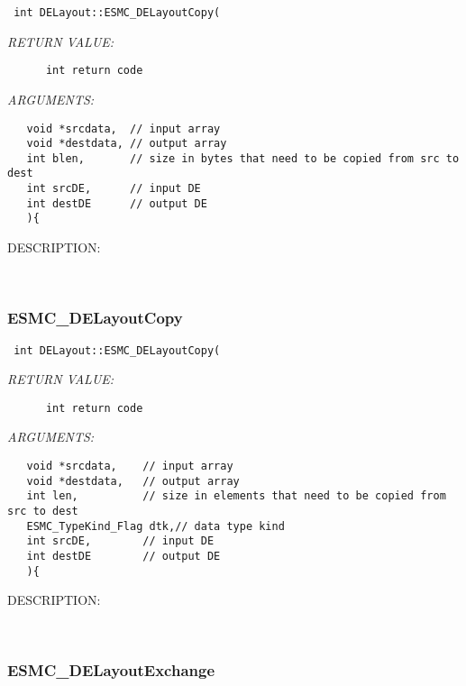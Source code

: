   
\begin{verbatim} int DELayout::ESMC_DELayoutCopy(\end{verbatim}{\em RETURN VALUE:}
\begin{verbatim}      int return code\end{verbatim}{\em ARGUMENTS:}
\begin{verbatim}   void *srcdata,  // input array
   void *destdata, // output array
   int blen,       // size in bytes that need to be copied from src to dest
   int srcDE,      // input DE
   int destDE      // output DE
   ){\end{verbatim}
{\sf DESCRIPTION:\\ }


   
 
\mbox{}\hrulefill\
 
\subsubsection [ESMC\_DELayoutCopy] {ESMC\_DELayoutCopy}


  
\begin{verbatim} int DELayout::ESMC_DELayoutCopy(\end{verbatim}{\em RETURN VALUE:}
\begin{verbatim}      int return code\end{verbatim}{\em ARGUMENTS:}
\begin{verbatim}   void *srcdata,    // input array
   void *destdata,   // output array
   int len,          // size in elements that need to be copied from src to dest
   ESMC_TypeKind_Flag dtk,// data type kind
   int srcDE,        // input DE
   int destDE        // output DE
   ){\end{verbatim}
{\sf DESCRIPTION:\\ }


   
 
\mbox{}\hrulefill\
 
\subsubsection [ESMC\_DELayoutExchange] {ESMC\_DELayoutExchange}


